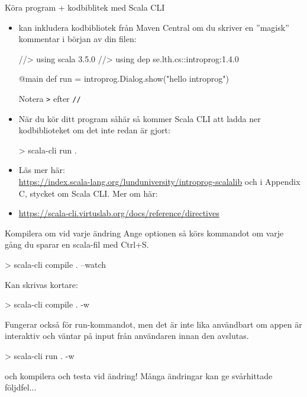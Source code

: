\begin{Slide}{Köra program + kodbiblitek med Scala CLI}\SlideFontTiny
\begin{itemize}
\item {} kan inkludera kodbibliotek från Maven Central om du skriver en ''magisk'' kommentar i början av din filen:
\begin{Code}
//> using scala 3.5.0
//> using dep se.lth.cs::introprog:1.4.0

@main def run = introprog.Dialog.show("hello introprog")
\end{Code}
Notera \texttt{>} efter \texttt{//}

\item När du kör ditt program såhär så kommer Scala CLI att ladda ner kodbiblioteket om det inte redan är gjort:
\begin{REPLsmall}
> scala-cli run .
\end{REPLsmall}
\item Läs mer här:\\\url{https://index.scala-lang.org/lunduniversity/introprog-scalalib} och i Appendix C, stycket om Scala CLI. Mer om  här:
\item[] \url{https://scala-cli.virtuslab.org/docs/reference/directives}
\end{itemize}

\end{Slide}

\begin{Slide}{Kompilera om vid varje ändring}\SlideFontSmall
Ange optionen  så körs kommandot om varje gång du sparar en scala-fil med Ctrl+S.
\begin{REPLsmall}
> scala-cli compile . --watch
\end{REPLsmall}
Kan skrivas kortare:
\begin{REPLsmall}
> scala-cli compile . -w
\end{REPLsmall}
Fungerar också för run-kommandot, men det är inte lika användbart om appen är interaktiv och väntar på input från användaren innan den avslutas. 
\begin{REPLsmall}
> scala-cli run . -w
\end{REPLsmall}
 och kompilera och testa vid  ändring! Många ändringar kan ge svårhittade följdfel...
    
  
\end{Slide}

